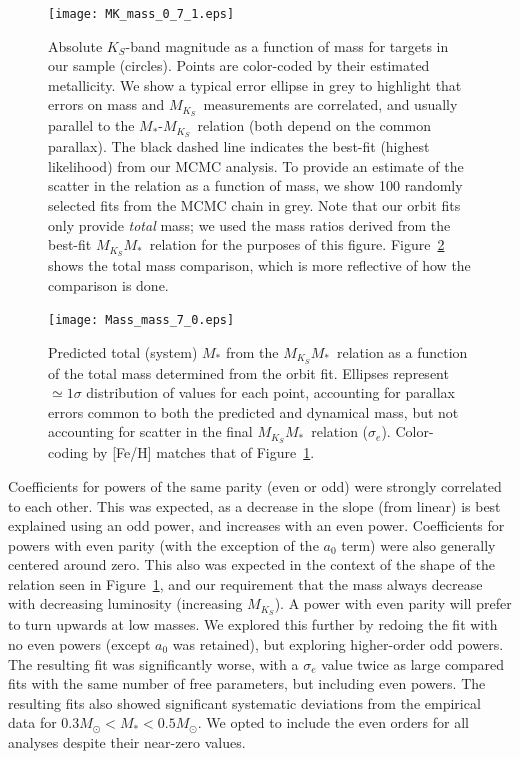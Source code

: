 \documentclass[twocolumn]{aastex62}
\newcommand{\mks}{$M_{K_S}$}
\newcommand{\mmk}{$M_{K_S}$\textendash$M_*$}
\begin{document}
\begin{figure}[htp]
\begin{center}
\texttt{[image: MK\_mass\_0\_7\_1.eps]}
\caption{Absolute $K_S$-band magnitude as a function of mass for targets in our sample (circles). Points are color-coded by their estimated metallicity. We show a typical error ellipse in grey to highlight that errors on mass and \mks\ measurements are correlated, and usually parallel to the $M_*$-\mks\ relation (both depend on the common parallax). The black dashed line indicates the best-fit (highest likelihood) from our MCMC analysis. To provide an estimate of the scatter in the relation as a function of mass, we show 100 randomly selected fits from the MCMC chain in grey. Note that our orbit fits only provide {\it total} mass; we used the mass ratios derived from the best-fit \mmk\ relation for the purposes of this figure. Figure~\ref{fig:m_m} shows the total mass comparison, which is more reflective of how the comparison is done. }
\label{fig:relation}
\end{center}
\end{figure}

\begin{figure}[ht]
\begin{center}
\texttt{[image: Mass\_mass\_7\_0.eps]}
\caption{Predicted total (system) $M_*$ from the \mmk\ relation as a function of the total mass determined from the orbit fit. Ellipses represent $\simeq1\sigma$ distribution of values for each point, accounting for parallax errors common to both the predicted and dynamical mass, but not accounting for scatter in the final \mmk\ relation ($\sigma_e$). Color-coding by [Fe/H] matches that of Figure~\ref{fig:relation}.}
\label{fig:m_m}
\end{center}
\end{figure}


Coefficients for powers of the same parity (even or odd) were strongly correlated to each other. This was expected, as a decrease in the slope (from linear) is best explained using an odd power, and increases with an even power. Coefficients for powers with even parity (with the exception of the $a_0$ term) were also generally centered around zero. This also was expected in the context of the shape of the relation seen in Figure~\ref{fig:relation}, and our requirement that the mass always decrease with decreasing luminosity (increasing \mks). A power with even parity will prefer to turn upwards at low masses. We explored this further by redoing the fit with no even powers (except $a_0$ was retained), but exploring higher-order odd powers. The resulting fit was significantly worse, with a $\sigma_e$ value twice as large compared fits with the same number of free parameters, but including even powers. The resulting fits also showed significant systematic deviations from the empirical data for $0.3M_\odot<M_*<0.5M_\odot$. We opted to include the even orders for all analyses despite their near-zero values. 
\end{document}
